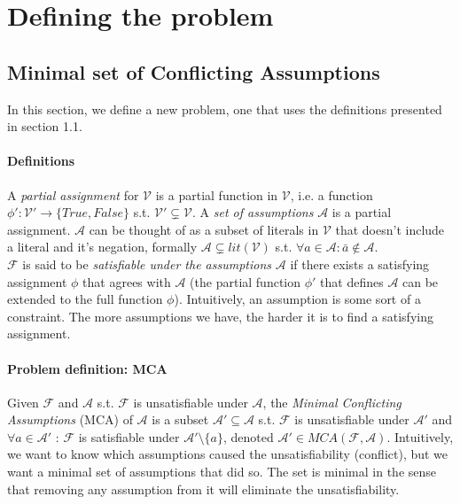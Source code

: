 \documentclass[]{article}
\begin{document}
	\section{Defining the problem}
	\subsection{Minimal set of Conflicting Assumptions}
	In this section, we define a new problem, one that uses the definitions presented in section 1.1.
	\paragraph{Definitions} A \textit{partial assignment} for $ \mathcal{V} $ is a partial function in $ \mathcal{V} $, i.e. a function $ \phi' : \mathcal{V}' \rightarrow \{True, False\} $ s.t. $\mathcal{V}' \subsetneq \mathcal{V}$. A \textit{set of assumptions} $ \mathcal{A} $ is a partial assignment. $ \mathcal{A} $ can be thought of as a subset of literals in $\mathcal{V}$ that doesn't include a literal and it's negation, formally $ \mathcal{A} \subsetneq lit(\mathcal{V}) $ s.t. $ \forall a \in \mathcal{A} : \bar{a} \notin \mathcal{A} $.\\
	$ \mathcal{F} $ is said to be \textit{satisfiable under the assumptions} $ \mathcal{A} $ if there exists a satisfying assignment $ \phi $ that agrees with $ \mathcal{A} $ (the partial function $ \phi' $ that defines $ \mathcal{A} $ can be extended to the full function $ \phi $). Intuitively, an assumption is some sort of a constraint. The more assumptions we have, the harder it is to find a satisfying assignment.
	\paragraph{Problem definition: MCA} Given $ \mathcal{F} $ and $ \mathcal{A} $ s.t. $ \mathcal{F} $ is unsatisfiable under $ \mathcal{A} $, the \textit{Minimal Conflicting Assumptions} (MCA) of $ \mathcal{A} $ is a subset $ \mathcal{A}' \subseteq \mathcal{A} $ s.t. $ \mathcal{F} $ is unsatisfiable under $ \mathcal{A}' $ and $ \forall a \in \mathcal{A}' $ : $ \mathcal{F} $ is satisfiable under $ \mathcal{A}' \setminus \{a\} $, denoted $ \mathcal{A}' \in MCA(\mathcal{F},\mathcal{A}) $. Intuitively, we want to know which assumptions caused the unsatisfiability (conflict), but we want a minimal set of assumptions that did so. The set is minimal in the sense that removing any assumption from it will eliminate the unsatisfiability.\\
\end{document}
